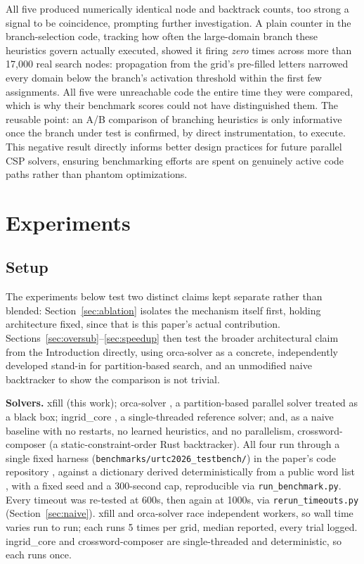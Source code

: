 \documentclass[conference]{IEEEtran}
\begin{document}
All five produced numerically identical node and backtrack counts, too strong a signal to be coincidence, prompting further investigation. A plain counter in the branch-selection code, tracking how often the large-domain branch these heuristics govern actually executed, showed it firing \textit{zero} times across more than 17{,}000 real search nodes: propagation from the grid's pre-filled letters narrowed every domain below the branch's activation threshold within the first few assignments. All five were unreachable code the entire time they were compared, which is why their benchmark scores could not have distinguished them. The reusable point: an A/B comparison of branching heuristics is only informative once the branch under test is confirmed, by direct instrumentation, to execute. This negative result directly informs better design practices for future parallel CSP solvers, ensuring benchmarking efforts are spent on genuinely active code paths rather than phantom optimizations.

\section{Experiments}
\label{sec:experiments}

\subsection{Setup}
The experiments below test two distinct claims kept separate rather than blended: Section~\ref{sec:ablation} isolates the mechanism itself first, holding architecture fixed, since that is this paper's actual contribution. Sections~\ref{sec:oversub}--\ref{sec:speedup} then test the broader architectural claim from the Introduction directly, using orca-solver as a concrete, independently developed stand-in for partition-based search, and an unmodified naive backtracker to show the comparison is not trivial.

\textbf{Solvers.} xfill (this work); orca-solver \cite{orcasolver}, a partition-based parallel solver treated as a black box; ingrid\_core \cite{ingridcore}, a single-threaded reference solver; and, as a naive baseline with no restarts, no learned heuristics, and no parallelism, crossword-composer \cite{crosswordcomposer} (a static-constraint-order Rust backtracker). All four run through a single fixed harness (\texttt{benchmarks/urtc2026\_testbench/}) in the paper's code repository \cite{xfillrepo}, against a dictionary derived deterministically from a public word list \cite{spreadthewordlist}, with a fixed seed and a 300-second cap, reproducible via \texttt{run\_benchmark.py}. Every timeout was re-tested at 600s, then again at 1000s, via \texttt{rerun\_timeouts.py} (Section~\ref{sec:naive}). xfill and orca-solver race independent workers, so wall time varies run to run; each runs 5 times per grid, median reported, every trial logged. ingrid\_core and crossword-composer are single-threaded and deterministic, so each runs once.
\end{document}
